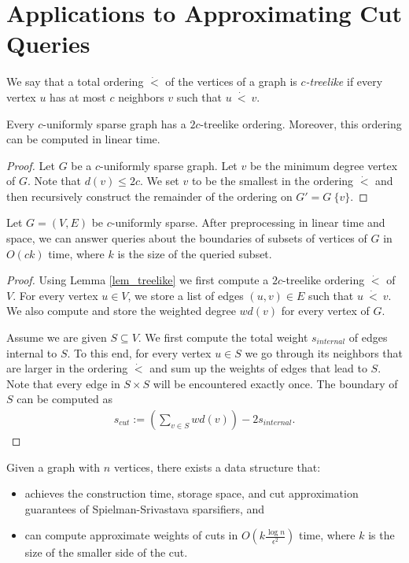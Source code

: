 \section{Applications to Approximating Cut Queries}

\begin{definition}
	We say that a total ordering $\dot{<}$ of the vertices of a graph is \emph{$c$-treelike} if every vertex $u$ has at most $c$ neighbors $v$ such that $u~\dot{<}~v$. 
\end{definition}
\begin{lemma}
	\label{lem_treelike}
	Every $c$-uniformly sparse graph has a $2c$-treelike ordering. Moreover, this ordering can be computed in linear time.
\end{lemma}
\begin{proof}
	Let $G$ be a $c$-uniformly sparse graph.
	Let $v$ be the minimum degree vertex of $G$.
	Note that $d(v) \leq 2c$.
	We set $v$ to be the smallest in the ordering $\dot{<}$ and then recursively construct the remainder of the ordering on $G' = G \ \{v\}$.
\end{proof}
\begin{lemma}
	Let $G = (V, E)$ be $c$-uniformly sparse.
	After preprocessing in linear time and space, we can answer queries about the boundaries of subsets of vertices of $G$ in $O(ck)$ time, where $k$ is the size of the queried subset.
\end{lemma}
\begin{proof}
	Using Lemma \ref{lem_treelike} we first compute a $2c$-treelike ordering $\dot{<}$ of $V$.
	For every vertex $u \in V$, we store a list of edges $(u, v) \in E$ such that $u~\dot{<}~v$.
	We also compute and store the weighted degree $wd(v)$ for every vertex of $G$.
	
	Assume we are given $S \subseteq V$.
	We first compute the total weight $s_{internal}$ of edges internal to $S$.
	To this end, for every vertex $u \in S$ we go through its neighbors that are larger in the ordering $\dot{<}$ and sum up the weights of edges that lead to $S$.
	Note that every edge in $S \times S$ will be encountered exactly once.
	The boundary of $S$ can be computed as
	\begin{align*}
		s_{cut} := \left(\sum_{v \in S} wd(v)\right) - 2s_{internal}. 
	\end{align*}
\end{proof}
\begin{corollary}
	Given a graph with $n$ vertices, there exists a data structure that:
	\begin{itemize}
	  \item achieves the construction time, storage space, and cut approximation guarantees of Spielman-Srivastava sparsifiers, and
	  \item can compute approximate weights of cuts in $O(k \frac{\log n}{\epsilon^2})$ time, where $k$ is the size of the smaller side of the cut.
	\end{itemize}
\end{corollary}
